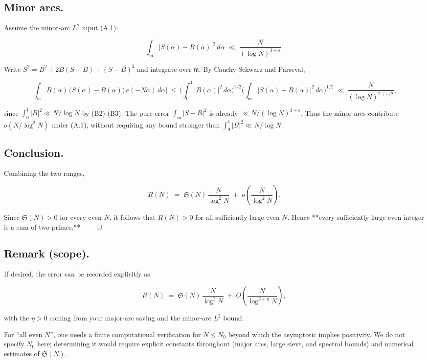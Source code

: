 \documentclass[11pt]{article}
\theoremstyle{definition}
\theoremstyle{remark}
\begin{document}
\subsection*{Minor arcs.}

Assume the minor-arc $L^2$ input (A.1):

$$
\int_{\mathfrak m} |S(\alpha)-B(\alpha)|^2\,d\alpha
\;\ll\;\frac{N}{(\log N)^{3+\varepsilon}}.
$$

Write $S^2=B^2+2B(S-B)+(S-B)^2$ and integrate over $\mathfrak m$.
By Cauchy-Schwarz and Parseval,

$$
\Big|\int_{\mathfrak m} B(\alpha)\,\big(S(\alpha)-B(\alpha)\big)\,e(-N\alpha)\,d\alpha\Big|
\ \le\ \Big(\int_0^1 |B(\alpha)|^2\,d\alpha\Big)^{1/2}
\Big(\int_{\mathfrak m}|S(\alpha)-B(\alpha)|^2\,d\alpha\Big)^{1/2}
\ \ll\ \frac{N}{(\log N)^{2+\varepsilon/2}},
$$

since $\int_0^1|B|^2\ll N/\log N$ by (B2)-(B3). The pure error $\int_{\mathfrak m}|S-B|^2$ is already $\ll N/(\log N)^{3+\varepsilon}$. Thus the minor arcs contribute $o\!\left(N/\log^2 N\right)$ under (A.1), without requiring any bound stronger than $\int_0^1|B|^2\ll N/\log N$.

\subsection*{Conclusion.}

Combining the two ranges,

$$
R(N)
\;=\;\mathfrak S(N)\,\frac{N}{\log^2 N}\;+\;o\!\left(\frac{N}{\log^2 N}\right).
$$

Since $\mathfrak S(N)>0$ for every even $N$, it follows that $R(N)>0$ for all sufficiently large even $N$. Hence **every sufficiently large even integer is a sum of two primes.** $\qed$

\subsection*{Remark (scope).} 
If desired, the error can be recorded explicitly as

$$
R(N)\;=\;\mathfrak S(N)\,\frac{N}{\log^2 N}\;+\;O\!\left(\frac{N}{\log^{2+\eta}N}\right),
$$

with the $\eta>0$ coming from your major-arc saving and the minor-arc $L^2$ bound.

For “all even $N$”, one needs a finite computational verification for $N\le N_0$ beyond which the asymptotic implies positivity. We do not specify $N_0$ here; determining it would require explicit constants throughout (major arcs, large sieve, and spectral bounds) and numerical estimates of $\mathfrak S(N)$.
\end{document}

